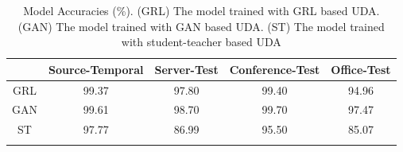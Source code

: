 \documentclass{article}
\begin{document}
\begin{table}[ht]
\caption{Model Accuracies (\%). (GRL) The model trained with GRL based UDA. (GAN) The model trained with GAN based UDA. (ST) The model trained with student-teacher based UDA}
\begin{center}
\begin{tabular}{ccccc} 
\hline
  & Source-Temporal & Server-Test & Conference-Test  & Office-Test \\
\hline
 GRL & 99.37 & 97.80 & 99.40 & 94.96 \\ 
\hline
 GAN & 99.61 & 98.70 & 99.70 & 97.47 \\ 
\hline
 ST & 97.77 & 86.99 & 95.50 & 85.07 \\ 
\hline
\label{udatab}
\end{tabular}
\end{center}
\end{table}


\end{document}
